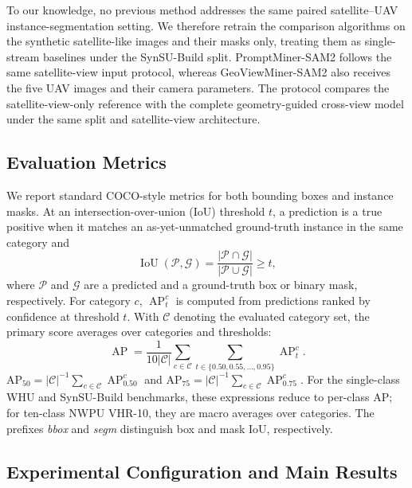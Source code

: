 \documentclass[letterpaper,journal]{IEEEtran}
\begin{document}
To our knowledge, no previous method addresses the same paired satellite--UAV
instance-segmentation setting. We therefore retrain the comparison algorithms on the synthetic
satellite-like images and their masks only, treating them as single-stream baselines
under the SynSU-Build split. PromptMiner-SAM2 follows the same satellite-view input protocol,
whereas GeoViewMiner-SAM2 also receives the five UAV images and their camera parameters. The
protocol compares the satellite-view-only reference with the complete geometry-guided cross-view
model under the same split and satellite-view architecture.

\subsection{Evaluation Metrics}
\label{sec:evaluation_metrics}
We report standard COCO-style metrics for both bounding boxes and instance masks. At an
intersection-over-union (IoU) threshold $t$, a prediction is a true positive when it matches an
as-yet-unmatched ground-truth instance in the same category and
\begin{equation}
\operatorname{IoU}(\mathcal{P},\mathcal{G})=
\frac{|\mathcal{P}\cap\mathcal{G}|}{|\mathcal{P}\cup\mathcal{G}|}\geq t,
\end{equation}
where $\mathcal{P}$ and $\mathcal{G}$ are a predicted and a ground-truth box or binary mask,
respectively. For category $c$, $\operatorname{AP}^c_t$ is computed from predictions ranked by
confidence at threshold $t$. With $\mathcal{C}$ denoting the evaluated category set, the
primary score averages over categories and thresholds:
\begin{equation}
\operatorname{AP}=\frac{1}{10|\mathcal{C}|}
\sum_{c\in\mathcal{C}}\sum_{t\in\{0.50,0.55,\ldots,0.95\}}
\operatorname{AP}^{c}_t.
\end{equation}
AP$_{50}=|\mathcal{C}|^{-1}\sum_{c\in\mathcal{C}}\operatorname{AP}_{0.50}^{c}$ and
AP$_{75}=|\mathcal{C}|^{-1}\sum_{c\in\mathcal{C}}\operatorname{AP}_{0.75}^{c}$. For the
single-class WHU and SynSU-Build benchmarks, these expressions reduce to per-class AP; for
ten-class NWPU VHR-10, they are macro averages over categories. The prefixes \emph{bbox} and
\emph{segm} distinguish box and mask IoU, respectively.

\subsection{Experimental Configuration and Main Results}
\label{sec:implementation_results}
\end{document}
